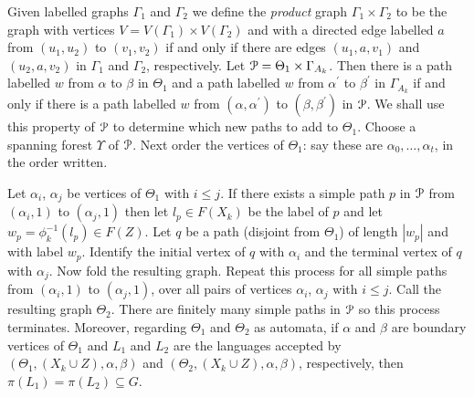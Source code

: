 \documentclass[a4paper,12pt]{article}
\renewcommand{\a}{\alpha }
\renewcommand{\b}{\beta }
\newcommand{\G}{\Gamma }
\newcommand{\T}{\Theta }
\newcommand{\U}{\Upsilon }
\newcommand{\cP}{{\cal{P}}}
\numberwithin{equation}{section}
\numberwithin{figure}{section}
\begin{document}
Given labelled graphs $\G_1$ and $\G_2$ we define the {\em
product} graph $\G_1\times \G_2$ to be the graph with vertices
$V=V(\G_1)\times V(\G_2)$ and with a directed edge labelled $a$
from $(u_1,u_2)$ to $(v_1,v_2)$ if and only if there are edges
$(u_1,a, v_1)$ and $(u_2,a,v_2)$ in $\G_1$ and $\G_2$,
respectively. Let $\cP=\T_1\times \G_{A_k}$. Then there is a path
 labelled $w$ from $\a$ to $\b$
in $\T_1$ {\ef {$\T_1$?}}and a path labelled $w$ from $\a^\prime $
to $\b^\prime$ in $\G_{A_k}$ if and only if there is a path
labelled $w$ from $(\a,\a^\prime)$ to $(\b,\b^\prime)$ in $\cP$.
 We shall
use this property of $\cP$ to determine which new paths to add  to
$\T_1$. Choose a spanning  forest $\U$ of  $\cP$. Next
 order the vertices of
$\T_1$: say these are $\a_0,\ldots, \a_t$, in the order written.

Let $\a_i$, $\a_j$ be vertices of  $\T_1$ with $i\le j$. If there
exists a simple path $p$ in $\cP$ from $(\a_i,1)$ to $(\a_j,1)$
then let $l_p\in F(X_k)$ be the label of $p$ and let
$w_p=\phi_k^{-1}(l_p)\in F(Z)$. Let $q$ be a path (disjoint from
$\T_1$) of length $|w_p|$ and with label $w_p$. Identify the
initial vertex of $q$ with $\a_i$ and the terminal vertex of $q$
with $\a_j$. Now fold the resulting graph. Repeat this process for
all simple paths from  $(\a_i,1)$ to $(\a_j,1)$, over all pairs of
vertices $\a_i$, $\a_j$ with $i\le j$. Call the resulting graph
$\T_2$. There are finitely many simple paths in $\cP$ so this
process terminates. Moreover, regarding $\T_1$ and $\T_2$ as
automata, if $\a$ and
 $\b$ are
boundary vertices of $\T_1$ and $L_1$ and $L_2$ are the
languages accepted by $(\T_1,(X_k\cup Z), \a,\b)$ and
$(\T_2,(X_k\cup Z), \a,\b)$, respectively, then $\pi(L_1)=\pi(L_2)\subseteq G$.
\end{document}
